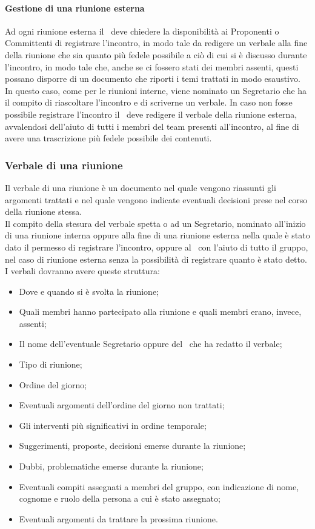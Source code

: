 \documentclass[../NormeProgetto.tex]{subfiles}
\begin{document}
		\paragraph{Gestione di una riunione esterna}
		Ad ogni riunione esterna il \responsabilediprogetto\ deve chiedere la disponibilità ai Proponenti o Committenti di registrare l'incontro, in modo tale da redigere un verbale alla fine della riunione che sia quanto più fedele possibile a ciò di cui si è discusso durante l'incontro, in modo tale che, anche se ci fossero stati dei membri assenti, questi possano disporre di un documento che riporti i temi trattati in modo esaustivo. In questo caso, come per le riunioni interne, viene nominato un Segretario che ha il compito di riascoltare l'incontro e di scriverne un verbale. In caso non fosse possibile registrare l'incontro il \responsabilediprogetto\ deve redigere il verbale della riunione esterna, avvalendosi dell'aiuto di tutti i membri del team presenti all'incontro, al fine di avere una trascrizione più fedele possibile dei contenuti.
		\subsubsection{Verbale di una riunione}
		Il verbale di una riunione è un documento nel quale vengono riassunti gli argomenti trattati e nel quale vengono indicate eventuali decisioni prese nel corso della riunione stessa.\\ Il compito della stesura del verbale spetta o ad un Segretario, nominato all'inizio di una riunione interna oppure alla fine di una riunione esterna nella quale è stato dato il permesso di registrare l'incontro, oppure al \responsabilediprogetto\ con l'aiuto di tutto il gruppo, nel caso di riunione esterna senza la possibilità di registrare quanto è stato detto.\\ I verbali dovranno avere queste struttura:
		\begin{itemize}
		\item Dove e quando si è svolta la riunione;
		\item Quali membri hanno partecipato alla riunione e quali membri erano, invece, assenti;
		\item Il nome dell'eventuale Segretario oppure del \responsabilediprogetto\ che ha redatto il verbale;
		\item Tipo di riunione;
		\item Ordine del giorno;
		\item Eventuali argomenti dell'ordine del giorno non trattati;
		\item Gli interventi più significativi in ordine temporale;
		\item Suggerimenti, proposte, decisioni emerse durante la riunione;
		\item Dubbi, problematiche emerse durante la riunione;
		\item Eventuali compiti assegnati a membri del gruppo, con indicazione di nome, cognome e ruolo della persona a cui è stato assegnato;
		\item Eventuali argomenti da trattare la prossima riunione.
		\end{itemize}
\end{document}
